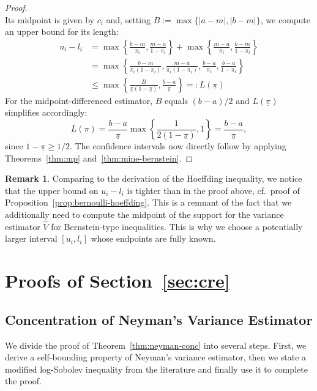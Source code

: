 \documentclass[aos]{imsart2}
\theoremstyle{plain}
\theoremstyle{definition}
\newtheorem*{remark}{Remark}
\newcommand{\vh}{\hat{V}}
\newcommand{\piu}{\underline{\pi}}
\begin{document}
\begin{appendix}
\begin{proof}
\begin{equation*}
    \end{equation*}
    Its midpoint is given by $c_i$ and, setting $B:=\max\{\lvert a-m\rvert, \lvert b -m \rvert\}$, we compute an upper bound for its length:
    \begin{align*}
        u_i-l_i &= \max\left\{\frac{b-m}{\pi_i}, \frac{m-a}{1-\pi_i}\right\} + \max\left\{\frac{m-a}{\pi_i}, \frac{b-m}{1-\pi_i}\right\}\\
        &= \max\left\{\frac{b-m}{\pi_i(1-\pi_i)}, \frac{m-a}{\pi_i(1-\pi_i)}, \frac{b-a}{\pi_i}, \frac{b-a}{1-\pi_i}\right\}\\
        &\leq \max\left\{\frac{B}{\piu(1-\piu)}, \frac{b-a}{\piu}\right\}=:L(\piu)
    \end{align*}
    For the midpoint-differenced estimator, $B$ equals $(b-a)/2$ and $L(\piu)$ simplifies accordingly:
    \begin{equation*}
        L(\piu) = \frac{b-a}{\piu} \max\left\{\frac{1}{2(1-\piu)},1\right\} = \frac{b-a}{\piu},
    \end{equation*}
    since $1-\piu \geq 1/2$. The confidence intervals now directly follow by applying Theorems~\ref{thm:mp} and~\ref{thm:mine-bernstein}.    
\end{proof}

\begin{remark}
    Comparing to the derivation of the Hoeffding inequality, we notice that the upper bound on $u_i-l_i$ is tighter than in the proof above, cf.\ proof of Proposition~\ref{prop:bernoulli-hoeffding}. This is a remnant of the fact that we additionally need to compute the midpoint of the support for the variance estimator $\vh$ for Bernstein-type inequalities. This is why we choose a potentially larger interval $[u_i, l_i]$ whose endpoints are fully known.
\end{remark}


\section{Proofs of Section~\ref{sec:cre}}
\subsection{Concentration of Neyman's Variance Estimator}\label{app:proof-neyman}

We divide the proof of Theorem~\ref{thm:neyman-conc} into several steps. First, we derive a self-bounding property of Neyman's variance estimator, then we state a modified log-Sobolev inequality from the literature and finally use it to complete the proof.


\end{appendix}
\end{document}
